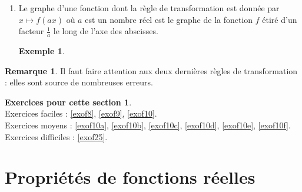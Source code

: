 \documentclass[a4paper,13pt]{scrreprt}
\theoremstyle{plain}
\theoremstyle{definition}
\newtheorem{exe}[subsection]{Exemple}
\newtheorem{rema}[subsection]{Remarque}
\newtheorem*{epcs}{Exercices pour cette section}
\begin{document}
\begin{enumerate}
\begin{exe}
\begin{center}
		\end{center}
	\end{exe}
\newpage
	\item Le graphe d'une fonction dont la règle de transformation est donnée par $x \mapsto f(ax)$ où $a$ est un nombre réel est le graphe de la fonction $f$ étiré d'un facteur $\frac{1}{a}$ le long de l'axe des abscisses.
	\begin{exe} ~~\\
		\begin{center}
		\end{center}
	\end{exe}
\end{enumerate}
\begin{rema}
	Il faut faire attention aux deux dernières règles de transformation : elles sont source de nombreuses erreurs.
\end{rema}

\begin{epcs}
	~~\\
	Exercices faciles : \ref{exof8}, \ref{exof9}, \ref{exof10}.\\
	Exercices moyens : \ref{exof10a}, \ref{exof10b}, \ref{exof10c}, \ref{exof10d}, \ref{exof10e}, \ref{exof10f}. \\
	Exercices difficiles : \ref{exof25}.
\end{epcs}

\section{Propriétés de fonctions réelles}
\end{document}
